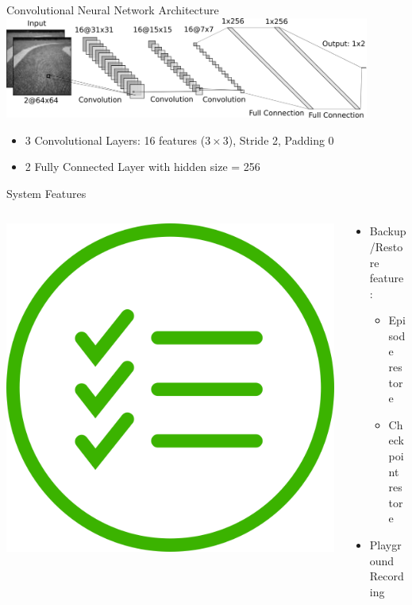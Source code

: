\documentclass[aspectratio=169]{beamer}
\begin{document}
\begin{frame}{Convolutional Neural Network Architecture}
	\centering
	\includegraphics[width=0.9\textwidth]{img/cnn_cozmo.png}
	\begin{itemize}[<+- | alert@+>]
		\item 3 Convolutional Layers: 16 features ($3\times3$), Stride 2, Padding 0
		\item 2 Fully Connected Layer with hidden size = 256
	\end{itemize}		
\end{frame}

\begin{frame}{System Features}
	\begin{columns}
		\begin{column}{0.4\linewidth}
			\centering
			\includegraphics[width=0.6\linewidth]{img/feature.png}
		\end{column}
		\begin{column}{0.6\linewidth}
			\begin{itemize}[<+- | alert@+>]
				\item Backup/Restore feature:
				\begin{itemize}[<+- | alert@+>]
					\item Episode restore
					\item Checkpoint restore
				\end{itemize}
				\item Playground Recording
			\end{itemize}
		\end{column}
	\end{columns}
\end{frame}
\end{document}
